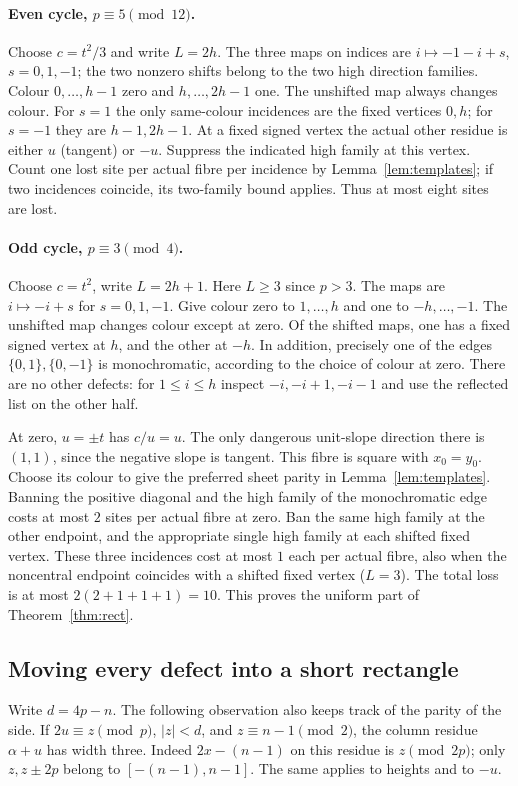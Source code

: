 \documentclass[11pt]{article}
\begin{document}
\paragraph{Even cycle, $p\equiv5\pmod{12}$.} Choose $c=t^2/3$ and write $L=2h$. The three maps on indices are $i\mapsto-1-i+s$, $s=0,1,-1$; the two nonzero shifts belong to the two high direction families. Colour $0,\ldots,h-1$ zero and $h,\ldots,2h-1$ one. The unshifted map always changes colour. For $s=1$ the only same-colour incidences are the fixed vertices $0,h$; for $s=-1$ they are $h-1,2h-1$. At a fixed signed vertex the actual other residue is either $u$ (tangent) or $-u$. Suppress the indicated high family at this vertex. Count one lost site per actual fibre per incidence by Lemma~\ref{lem:templates}; if two incidences coincide, its two-family bound applies. Thus at most eight sites are lost.

\paragraph{Odd cycle, $p\equiv3\pmod4$.} Choose $c=t^2$, write $L=2h+1$. Here $L\ge3$ since $p>3$. The maps are $i\mapsto-i+s$ for $s=0,1,-1$. Give colour zero to $1,\ldots,h$ and one to $-h,\ldots,-1$. The unshifted map changes colour except at zero. Of the shifted maps, one has a fixed signed vertex at $h$, and the other at $-h$. In addition, precisely one of the edges $\{0,1\},\{0,-1\}$ is monochromatic, according to the choice of colour at zero. There are no other defects: for $1\le i\le h$ inspect $-i,-i+1,-i-1$ and use the reflected list on the other half.

At zero, $u=\pm t$ has $c/u=u$. The only dangerous unit-slope direction there is $(1,1)$, since the negative slope is tangent. This fibre is square with $x_0=y_0$. Choose its colour to give the preferred sheet parity in Lemma~\ref{lem:templates}. Banning the positive diagonal and the high family of the monochromatic edge costs at most $2$ sites per actual fibre at zero. Ban the same high family at the other endpoint, and the appropriate single high family at each shifted fixed vertex. These three incidences cost at most $1$ each per actual fibre, also when the noncentral endpoint coincides with a shifted fixed vertex ($L=3$). The total loss is at most $2(2+1+1+1)=10$. This proves the uniform part of Theorem~\ref{thm:rect}.

\subsection{Moving every defect into a short rectangle}
Write $d=4p-n$. The following observation also keeps track of the parity of the side. If $2u\equiv z\pmod p$, $|z|<d$, and $z\equiv n-1\pmod2$, the column residue $\alpha+u$ has width three. Indeed $2x-(n-1)$ on this residue is $z\pmod{2p}$; only $z,z\pm2p$ belong to $[-(n-1),n-1]$. The same applies to heights and to $-u$.
\end{document}
